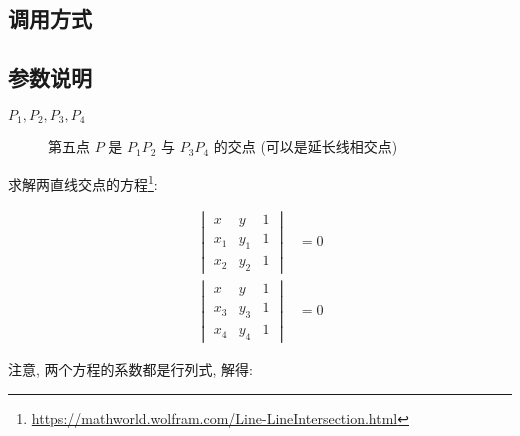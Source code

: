 \subsection{调用方式}


\subsection{参数说明}

\begin{description}
  \item[$P_1,P_2,P_3,P_4$] 第五点 $P$ 是 $P_1P_2$ 与 $P_3P_4$ 的交点 (可以是延长线相交点)
\end{description}

\begin{remark}

求解两直线交点的方程\footnote{\url{https://mathworld.wolfram.com/Line-LineIntersection.html}}:

\begin{align*}
  \begin{vmatrix}
    x & y & 1\\
    x_1 & y_1 & 1\\
    x_2 & y_2 & 1
  \end{vmatrix} & = 0\\
  \begin{vmatrix}
    x & y & 1\\
    x_3 & y_3 & 1\\
    x_4 & y_4 & 1
  \end{vmatrix} & = 0
\end{align*}

注意, 两个方程的系数都是行列式, 解得:


\end{remark}
